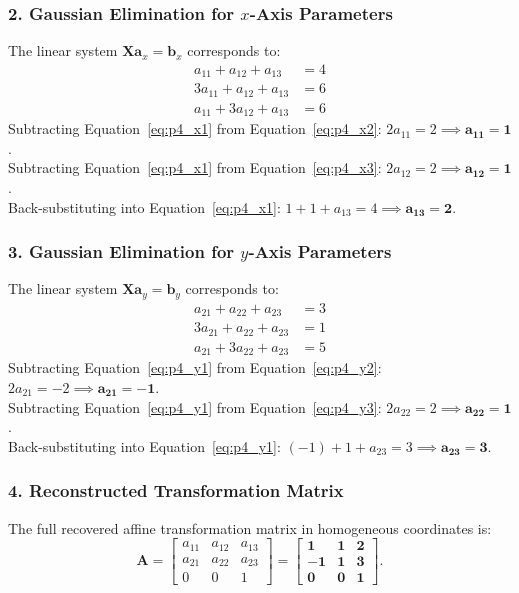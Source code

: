 \documentclass[11pt,a4paper]{article}
\begin{document}
\subsubsection{2. Gaussian Elimination for \texorpdfstring{$x$}{x}-Axis Parameters}
The linear system $\mathbf{X}\mathbf{a}_x = \mathbf{b}_x$ corresponds to:
\begin{align}
a_{11} + a_{12} + a_{13} &= 4 \label{eq:p4_x1} \\
3a_{11} + a_{12} + a_{13} &= 6 \label{eq:p4_x2} \\
a_{11} + 3a_{12} + a_{13} &= 6 \label{eq:p4_x3}
\end{align}
Subtracting Equation~\eqref{eq:p4_x1} from Equation~\eqref{eq:p4_x2}: $2a_{11} = 2 \implies \mathbf{a_{11} = 1}$. \\
Subtracting Equation~\eqref{eq:p4_x1} from Equation~\eqref{eq:p4_x3}: $2a_{12} = 2 \implies \mathbf{a_{12} = 1}$. \\
Back-substituting into Equation~\eqref{eq:p4_x1}: $1 + 1 + a_{13} = 4 \implies \mathbf{a_{13} = 2}$.

\subsubsection{3. Gaussian Elimination for \texorpdfstring{$y$}{y}-Axis Parameters}
The linear system $\mathbf{X}\mathbf{a}_y = \mathbf{b}_y$ corresponds to:
\begin{align}
a_{21} + a_{22} + a_{23} &= 3 \label{eq:p4_y1} \\
3a_{21} + a_{22} + a_{23} &= 1 \label{eq:p4_y2} \\
a_{21} + 3a_{22} + a_{23} &= 5 \label{eq:p4_y3}
\end{align}
Subtracting Equation~\eqref{eq:p4_y1} from Equation~\eqref{eq:p4_y2}: $2a_{21} = -2 \implies \mathbf{a_{21} = -1}$. \\
Subtracting Equation~\eqref{eq:p4_y1} from Equation~\eqref{eq:p4_y3}: $2a_{22} = 2 \implies \mathbf{a_{22} = 1}$. \\
Back-substituting into Equation~\eqref{eq:p4_y1}: $(-1) + 1 + a_{23} = 3 \implies \mathbf{a_{23} = 3}$.

\subsubsection{4. Reconstructed Transformation Matrix}
The full recovered affine transformation matrix in homogeneous coordinates is:
\begin{equation}
\mathbf{A} = \begin{bmatrix} a_{11} & a_{12} & a_{13} \\ a_{21} & a_{22} & a_{23} \\ 0 & 0 & 1 \end{bmatrix} = \mathbf{\begin{bmatrix} 1 & 1 & 2 \\ -1 & 1 & 3 \\ 0 & 0 & 1 \end{bmatrix}}.
\end{equation}
\end{document}
